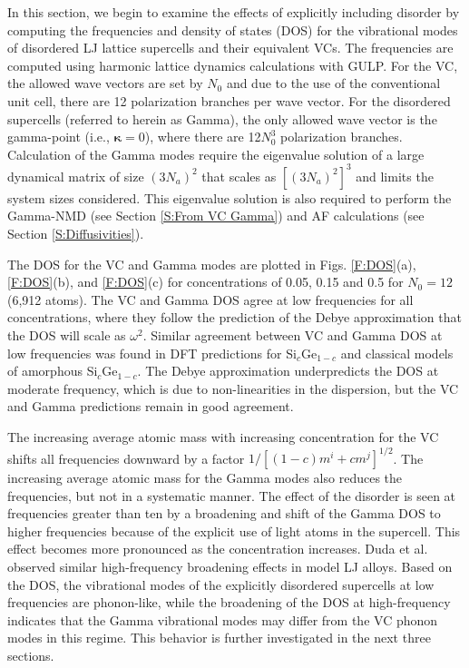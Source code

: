 \documentclass[aps,prb,onecolumn,preprint,footinbib,superscriptaddress,amsmath,amssymb,floatfix]{revtex4}
\begin{document}
In this section, we begin to examine the effects of explicitly including 
disorder by computing the frequencies and density of states (DOS)  
for the vibrational modes of disordered LJ lattice supercells and their 
equivalent VCs. The frequencies 
are computed using harmonic lattice dynamics calculations with  
GULP.\cite{gale_general_2003}  For the 
VC, the allowed wave vectors are set by $N_0$ and due to the use of the 
conventional unit cell, there are 12 
polarization branches per wave vector.  
For the disordered supercells (referred to herein as Gamma),
the only allowed wave vector is the gamma-point (i.e., $\pmb{\kappa}=0$),  
where there are 12$N_0^3$ polarization branches. Calculation of the 
Gamma modes require the eigenvalue solution of a large dynamical matrix of size 
$(3N_a)^2$ that scales as $[(3N_a)^2]^3$ and limits the system 
sizes considered.\cite{gale_general_2003} This eigenvalue solution is also 
required to perform the Gamma-NMD (see Section \ref{S:From VC Gamma})  
and AF calculations (see Section \ref{S:Diffusivities}). 

The DOS for the VC and Gamma modes are plotted in Figs. \ref{F:DOS}(a), 
\ref{F:DOS}(b), and \ref{F:DOS}(c) 
for concentrations of 0.05, 0.15 and 0.5 for 
$N_0=12$ (6,912 atoms). The VC and Gamma DOS 
agree at low frequencies for all concentrations, 
where they follow the prediction of the Debye approximation that 
the DOS will scale as $\omega^2$.\cite{ashcroft_solid_1976} 
Similar agreement between VC and Gamma DOS at low frequencies 
was found in DFT predictions 
for Si$_c$Ge$_{1-c}$\cite{garg_role_2011} and 
classical models of amorphous Si$_c$Ge$_{1-c}$.
\cite{bouchard_vibrational_1988} The Debye approximation 
underpredicts the DOS at moderate frequency, which is due to 
non-linearities in the dispersion,\cite{ashcroft_solid_1976} but the 
VC and Gamma predictions remain in good agreement. 

The increasing average atomic  
mass with increasing concentration for the VC shifts all   
frequencies downward by a factor $1/[(1-c)m^i + cm^j]^{1/2}$. 
The increasing average atomic 
mass for the Gamma modes also reduces the frequencies, but not in a 
systematic manner. 
The effect of the disorder is seen at frequencies greater than 
ten by a broadening and shift of the Gamma DOS to higher frequencies 
because of the explicit use of light atoms in the supercell. This effect 
becomes more pronounced as the concentration increases.  
Duda et al. 
observed similar high-frequency broadening effects in model LJ alloys.
\cite{duda_reducing_2011} 
Based on the DOS, the vibrational modes of the explicitly disordered 
supercells at low frequencies are phonon-like, while the broadening 
of the DOS at high-frequency indicates that the Gamma 
vibrational modes may differ from the VC phonon modes in this regime. 
This behavior is further investigated in the next three sections. 
\end{document}
